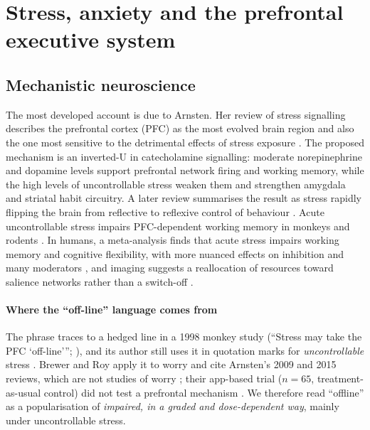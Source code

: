 \section{Stress, anxiety and the prefrontal executive system}\label{sec:stress}
\subsection{Mechanistic neuroscience}
The most developed account is due to Arnsten. Her review of stress signalling describes the prefrontal cortex (PFC) as the most evolved brain region and also the one most sensitive to the detrimental effects of stress exposure \citep{arnsten2009stress}. The proposed mechanism is an inverted-U in catecholamine signalling: moderate norepinephrine and dopamine levels support prefrontal network firing and working memory, while the high levels of uncontrollable stress weaken them and strengthen amygdala and striatal habit circuitry. A later review summarises the result as stress rapidly flipping the brain from reflective to reflexive control of behaviour \citep{arnsten2015stress}. Acute uncontrollable stress impairs PFC-dependent working memory in monkeys and rodents \citep{arnsten1998noise}. In humans, a meta-analysis finds that acute stress impairs working memory and cognitive flexibility, with more nuanced effects on inhibition and many moderators \citep{shields2016stress}, and imaging suggests a reallocation of resources toward salience networks rather than a switch-off \citep{hermans2014networks}.

\paragraph{Where the ``off-line'' language comes from} The phrase traces to a hedged line in a 1998 monkey study (``Stress may take the PFC `off-line'''; \citealt{arnsten1998noise}), and its author still uses it in quotation marks for \emph{uncontrollable} stress \citep{arnsten2020guanfacine}. Brewer and Roy apply it to worry and cite Arnsten's 2009 and 2015 reviews, which are not studies of worry \citep{brewer2021habit}; their app-based trial ($n=65$, treatment-as-usual control) did not test a prefrontal mechanism \citep{roy2021app}. We therefore read ``offline'' as a popularisation of \emph{impaired, in a graded and dose-dependent way}, mainly under uncontrollable stress.

